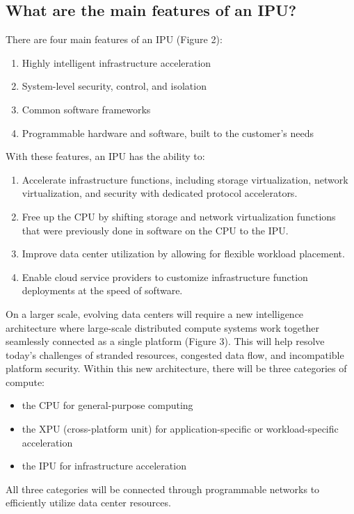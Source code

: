 \documentclass[../sn.tex]{subfiles}
\begin{document}
\subsection{What are the main features of an IPU?}
There are four main features of an IPU (Figure 2): 
\begin{enumerate}
    \item Highly intelligent infrastructure acceleration 
    \item System-level security, control, and isolation
    \item Common software frameworks 
    \item Programmable hardware and software, built to the customer's needs
\end{enumerate} With these features, an IPU has the ability to:
\begin{enumerate}
    \item Accelerate infrastructure functions, including storage virtualization, network virtualization, and security with dedicated protocol accelerators.
    \item Free up the CPU by shifting storage and network virtualization functions that were previously done in software on the CPU to the IPU. 
    \item Improve data center utilization by allowing for flexible workload placement.
    \item Enable cloud service providers to customize infrastructure function deployments at the speed of software. 
\end{enumerate} 
On a larger scale, evolving data centers will require a new intelligence architecture where large-scale distributed compute systems work together seamlessly connected as a single platform (Figure 3).
This will help resolve today's challenges of stranded resources, congested data flow, and incompatible platform security.
Within this new architecture, there will be three categories of compute:
\begin{itemize}
    \item the CPU for general-purpose computing
    \item the XPU (cross-platform unit) for application-specific or workload-specific acceleration
    \item the IPU for infrastructure acceleration
\end{itemize}
All three categories will be connected through programmable networks to efficiently utilize data center resources.

\clearpage
\end{document}
